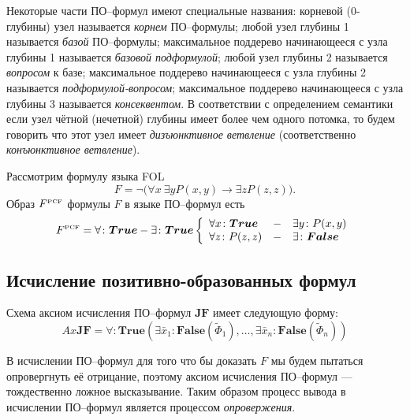 
Некоторые части ПО--формул имеют специальные названия: корневой (0-глубины) узел называется {\em корнем} ПО--формулы; любой узел глубины 1 называется {\em базой} ПО--формулы; максимальное поддерево начинающееся с узла глубины 1 называется {\em базовой подформулой}; любой узел глубины 2 называется {\em вопросом} к базе; максимальное поддерево начинающееся с узла глубины 2 называется {\em подформулой-вопросом}; максимальное поддерево начинающееся с узла глубины 3 называется {\em консеквентом}. В соответствии с определением семантики если узел чётной (нечетной) глубины имеет более чем одного потомка, то будем говорить что этот узел имеет {\em дизъюнктивное ветвление} (соответственно {\em конъюнктивное ветвление}).

\begin{example}
Рассмотрим формулу языка FOL
$$F= \neg\bigl(\forall x\:\exists y P(x,y)\rightarrow \exists z P(z,z)\bigr).$$
Образ $F^{\text{\tiny{PCF}}}$ формулы $F$ в языке ПО--формул есть
$$F^{\text{\tiny{PCF}}} = \forall\colon \boldsymbol{True}-\exists\colon\boldsymbol{True} \left\{
\begin{array}{lcl}
 \forall x\colon\boldsymbol{True} & - & \exists y\colon P(x,y) \\
 \forall z\colon P(z,z) & - & \exists\colon\boldsymbol{False}
\end{array}
\right.$$

\end{example}


\subsection{Исчисление позитивно-образованных формул}

Схема аксиом исчисления ПО--формул $\boldsymbol{JF}$ имеет следующую форму:
$$ Ax\boldsymbol{JF} = \forall\colon\boldsymbol{True}\left(\exists \bar{x}_1\colon\boldsymbol{False}\left(\widetilde{\Phi}_1\right),\ldots,\exists \bar{x}_n\colon\boldsymbol{False}\left(\widetilde{\Phi}_n\right)\right) $$

В исчислении ПО--формул для того что бы доказать $F$ мы будем пытаться опровергнуть её отрицание, поэтому аксиом исчисления ПО--формул ---  тождественно ложное высказывание. Таким образом процесс вывода в исчислении ПО--формул является процессом {\em опровержения}.

